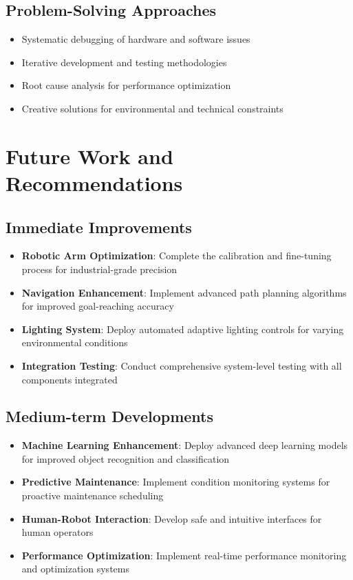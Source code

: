 \documentclass[12pt]{article}
\begin{document}
\subsection{Problem-Solving Approaches}
\begin{itemize}
\item Systematic debugging of hardware and software issues
\item Iterative development and testing methodologies
\item Root cause analysis for performance optimization
\item Creative solutions for environmental and technical constraints
\end{itemize}

\newpage

\section{Future Work and Recommendations}

\subsection{Immediate Improvements}
\begin{itemize}
\item \textbf{Robotic Arm Optimization}: Complete the calibration and fine-tuning process for industrial-grade precision
\item \textbf{Navigation Enhancement}: Implement advanced path planning algorithms for improved goal-reaching accuracy
\item \textbf{Lighting System}: Deploy automated adaptive lighting controls for varying environmental conditions
\item \textbf{Integration Testing}: Conduct comprehensive system-level testing with all components integrated
\end{itemize}

\subsection{Medium-term Developments}
\begin{itemize}
\item \textbf{Machine Learning Enhancement}: Deploy advanced deep learning models for improved object recognition and classification
\item \textbf{Predictive Maintenance}: Implement condition monitoring systems for proactive maintenance scheduling
\item \textbf{Human-Robot Interaction}: Develop safe and intuitive interfaces for human operators
\item \textbf{Performance Optimization}: Implement real-time performance monitoring and optimization systems
\end{itemize}
\end{document}
